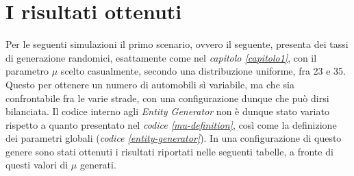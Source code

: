 \section{I risultati ottenuti}
Per le seguenti simulazioni il primo scenario, ovvero il seguente, presenta dei tassi di generazione randomici, esattamente come nel \textit{capitolo \ref{capitolo1}}, con il parametro $\mu$ scelto casualmente, secondo una distribuzione uniforme, fra 23 e 35. Questo per ottenere un numero di automobili sì variabile, ma che sia confrontabile fra le varie strade, con una configurazione dunque che può dirsi bilanciata. Il codice interno agli \textit{Entity Generator} non è dunque stato variato rispetto a quanto presentato nel \textit{codice \ref{mu-definition}}, così come la definizione dei parametri globali (\textit{codice \ref{entity-generator}}). In una configurazione di questo genere sono stati ottenuti i risultati riportati nelle seguenti tabelle, a fronte di questi valori di $\mu$ generati.
\newline

